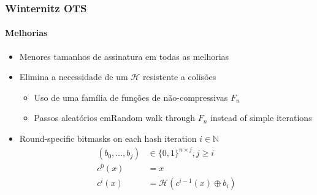 \documentclass[12pt]{beamer}
\newcommand{\hh}{$\mathcal{H}$}
\begin{document}
\begin{frame}
  \frametitle{Winternitz OTS}
  \framesubtitle{Melhorias}
  \begin{itemize}
    \item Menores tamanhos de assinatura em todas as melhorias
    \item Elimina a necessidade de um \hh{} resistente a colisões
    \begin{itemize}
      \item Uso de uma família de funções de não-compressivas $F_n$
      \item Passos aleatórios emRandom walk through $F_n$ instead of simple iterations
    \end{itemize}
    \item Round-specific bitmasks on each hash iteration $i \in \mathbb{N}$
    \begin{align*}
      (b_0, \dots, b_j) &\in \{0,1\}^{n \times j}, j \geq i \\
      c^0(x) &= x \\
      c^i(x) &= \mathcal{H}(c^{i-1}(x) \oplus b_i)
    \end{align*}
  \end{itemize}
\end{frame}
\end{document}
